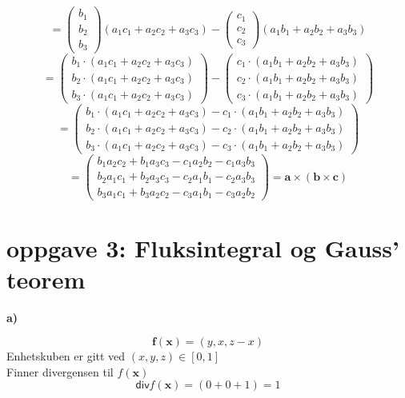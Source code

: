 \documentclass[11pt,a4paper, leqno]{report}
\begin{document}
	$$	=\left(\begin{array}{c}
			b_1\\
			b_2\\
			b_3
		\end{array}\right) (a_1 c_1+a_2 c_2 +a_3 c_3)-
\left(\begin{array}{c}
			c_1\\
			c_2\\
			c_3
		\end{array}\right)(a_1 b_1+a_2 b_2 +a_3 b_3)$$
$$	=\left(\begin{array}{c}
			b_1 \cdot (a_1 c_1+a_2 c_2 +a_3 c_3)\\
			b_2 \cdot (a_1 c_1+a_2 c_2 +a_3 c_3)\\
			b_3 \cdot (a_1 c_1+a_2 c_2 +a_3 c_3)
		\end{array}\right) -
\left(\begin{array}{c}
			c_1 \cdot (a_1 b_1+a_2 b_2 +a_3 b_3)\\
			c_2 \cdot (a_1 b_1+a_2 b_2 +a_3 b_3)\\
			c_3 \cdot (a_1 b_1+a_2 b_2 +a_3 b_3)
		\end{array}\right)$$
$$	=\left(\begin{array}{c}
			b_1 \cdot (a_1 c_1+a_2 c_2 +a_3 c_3)-c_1 \cdot (a_1 b_1+a_2 b_2 +a_3 b_3)\\
			b_2 \cdot (a_1 c_1+a_2 c_2 +a_3 c_3)-c_2 \cdot (a_1 b_1+a_2 b_2 +a_3 b_3)\\
			b_3 \cdot (a_1 c_1+a_2 c_2 +a_3 c_3)-c_3 \cdot (a_1 b_1+a_2 b_2 +a_3 b_3)
		\end{array}\right)$$
$$	=\left(\begin{array}{c}
			b_1 a_2 c_2 + b_1 a_3 c_3 - c_1 a_2 b_2 - c_1 a_3 b_3\\
			b_2 a_1 c_1 + b_2 a_3 c_3 - c_2 a_1 b_1 - c_2 a_3 b_3\\
			b_3 a_1 c_1 + b_3 a_2 c_2 - c_3 a_1 b_1 - c_3 a_2 b_2
		\end{array}\right)=\mathbf{a} \times (\mathbf{b} \times \mathbf{c})$$

\section{\textbf{oppgave 3: Fluksintegral og Gauss' teorem}}

	\textbf{a)}

	$$ \mathbf{f}(\mathbf{x})=(y, x,z-x)$$
	Enhetskuben er gitt ved $ (x, y, z)\in [0,1]$\\
	Finner divergensen til $f(\mathbf{x})$
	$$\mathsf{div} f(\mathbf{x})=(0+ 0 +1)=1$$
	
\end{document}
